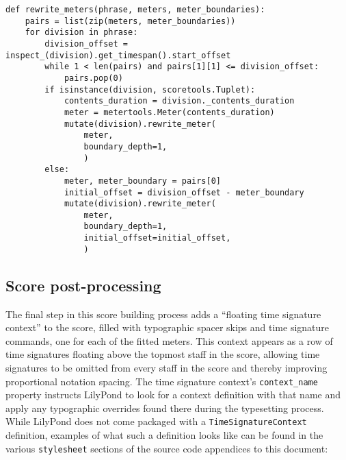 \begin{singlespacing}
\vspace{-0.5\baselineskip}
\begin{lstlisting}
def rewrite_meters(phrase, meters, meter_boundaries):
    pairs = list(zip(meters, meter_boundaries))
    for division in phrase:
        division_offset = inspect_(division).get_timespan().start_offset
        while 1 < len(pairs) and pairs[1][1] <= division_offset:
            pairs.pop(0)
        if isinstance(division, scoretools.Tuplet):
            contents_duration = division._contents_duration
            meter = metertools.Meter(contents_duration)
            mutate(division).rewrite_meter(
                meter,
                boundary_depth=1,
                )
        else:
            meter, meter_boundary = pairs[0]
            initial_offset = division_offset - meter_boundary
            mutate(division).rewrite_meter(
                meter,
                boundary_depth=1,
                initial_offset=initial_offset,
                )
\end{lstlisting}
\end{singlespacing}

\subsection{Score post-processing}
\label{ssec:score-post-processing}

\noindent The final step in this score building process adds a
\enquote{floating time signature context} to the score, filled with typographic
spacer skips and time signature commands, one for each of the fitted meters.
This context appears as a row of time signatures floating above the topmost
staff in the score, allowing time signatures to be omitted from every staff in
the score and thereby improving proportional notation spacing. The time
signature context's \texttt{context\_name} property instructs LilyPond to look
for a context definition with that name and apply any typographic overrides
found there during the typesetting process. While LilyPond does not come
packaged with a \texttt{TimeSignatureContext} definition, examples of what such
a definition looks like can be found in the various \texttt{stylesheet}
sections of the source code appendices to this document:

\begin{comment}
<abjadextract dissertation.py.time_tools:add_time_signature_context />[strip_prompt]
\end{comment}

